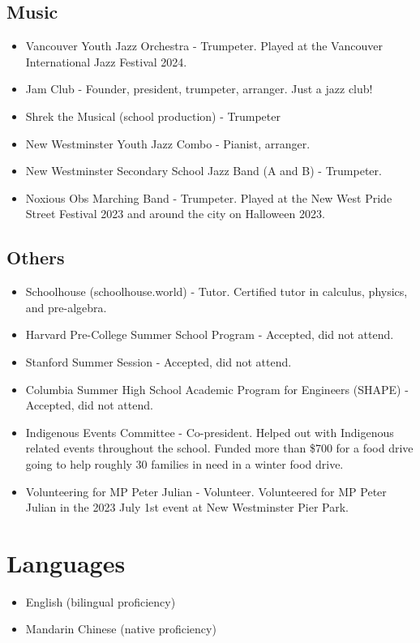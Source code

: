 \documentclass{article}
\begin{document}
\subsection*{Music}

\begin{itemize}
	\item Vancouver Youth Jazz Orchestra - Trumpeter. Played at the Vancouver International Jazz Festival 2024.
	\item Jam Club - Founder, president, trumpeter, arranger. Just a jazz club!
	\item Shrek the Musical (school production) - Trumpeter
	\item New Westminster Youth Jazz Combo - Pianist, arranger.
	\item New Westminster Secondary School Jazz Band (A and B) - Trumpeter.
	\item Noxious Obs Marching Band - Trumpeter. Played at the New West Pride Street Festival 2023 and around the city on Halloween 2023.
\end{itemize}

\subsection*{Others}
\begin{itemize}
	\item Schoolhouse (schoolhouse.world) - Tutor. Certified tutor in calculus, physics, and pre-algebra.
	\item Harvard Pre-College Summer School Program - Accepted, did not attend.
	\item Stanford Summer Session - Accepted, did not attend.
	\item Columbia Summer High School Academic Program for Engineers (SHAPE) - Accepted, did not attend.
	\item Indigenous Events Committee - Co-president. Helped out with Indigenous related events throughout the school. Funded more than \$700 for a food drive going to help roughly 30 families in need in a winter food drive.
	\item Volunteering for MP Peter Julian - Volunteer. Volunteered for MP Peter Julian in the 2023 July 1st event at New Westminster Pier Park.
\end{itemize}

\section*{Languages}

\begin{itemize}
	\item English (bilingual proficiency)
	\item Mandarin Chinese (native proficiency)
\end{itemize}
\end{document}
